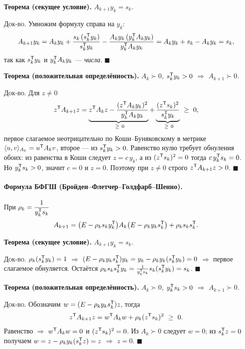 \textbf{Теорема (секущее условие).} \textit{$A_{k+1}y_k = s_k$.}

\textsc{Док-во.} Умножим формулу справа на $y_k$:
\[
  A_{k+1}y_k = A_k y_k
    + \frac{s_k\,(s_k^{\mathsf{T}} y_k)}{s_k^{\mathsf{T}} y_k}
    - \frac{A_k y_k\,(y_k^{\mathsf{T}} A_k y_k)}{y_k^{\mathsf{T}} A_k y_k}
    = A_k y_k + s_k - A_k y_k = s_k ,
\]
так как $s_k^{\mathsf{T}} y_k$ и $y_k^{\mathsf{T}} A_k y_k$ — \emph{числа}. $\blacksquare$

\textbf{Теорема (положительная определённость).}
\textit{$A_k \succ 0$, $s_k^{\mathsf{T}} y_k > 0$ $\Rightarrow$ $A_{k+1} \succ 0$.}

\textsc{Док-во.} Для $z \ne 0$
\[
  z^{\mathsf{T}} A_{k+1} z = \underbrace{z^{\mathsf{T}} A_k z
    - \frac{(z^{\mathsf{T}} A_k y_k)^2}{y_k^{\mathsf{T}} A_k y_k}}_{\ \ge\ 0}
    + \underbrace{\frac{(z^{\mathsf{T}} s_k)^2}{s_k^{\mathsf{T}} y_k}}_{\ \ge\ 0} \ \ge\ 0 ,
\]
первое слагаемое неотрицательно по Коши--Буняковскому в метрике
$\langle u,v\rangle_{A_k} = u^{\mathsf{T}} A_k v$, второе — из $s_k^{\mathsf{T}} y_k > 0$.
Равенство нулю требует обнуления обоих: из равенства в Коши следует
$z = c\,y_k$, а из $(z^{\mathsf{T}} s_k)^2 = 0$ тогда $c\,y_k^{\mathsf{T}} s_k = 0$. Но
$y_k^{\mathsf{T}} s_k > 0$, значит $c = 0$ и $z = 0$. Поэтому при $z \ne 0$ строго
$z^{\mathsf{T}} A_{k+1}z > 0$. $\blacksquare$

\paragraph{Формула БФГШ (Бройден--Флетчер--Голдфарб--Шенно).}
При $\rho_k = \dfrac{1}{y_k^{\mathsf{T}} s_k}$
\[
  A_{k+1} = \big(E - \rho_k s_k y_k^{\mathsf{T}}\big) A_k
            \big(E - \rho_k y_k s_k^{\mathsf{T}}\big) + \rho_k s_k s_k^{\mathsf{T}} .
\]

\textbf{Теорема (секущее условие).} \textit{$A_{k+1}y_k = s_k$.}

\textsc{Док-во.} $\rho_k(s_k^{\mathsf{T}} y_k) = 1$ $\Rightarrow$
$(E - \rho_k y_k s_k^{\mathsf{T}})y_k = y_k - \rho_k y_k (s_k^{\mathsf{T}} y_k) = 0$ $\Rightarrow$
первое слагаемое обнуляется. Остаётся
$\rho_k s_k s_k^{\mathsf{T}} y_k = \frac{1}{y_k^{\mathsf{T}} s_k}s_k (s_k^{\mathsf{T}} y_k) = s_k$.
$\blacksquare$

\textbf{Теорема (положительная определённость).}
\textit{$A_k \succ 0$, $y_k^{\mathsf{T}} s_k > 0$ $\Rightarrow$ $A_{k+1} \succ 0$.}

\textsc{Док-во.} Обозначим $w = (E - \rho_k y_k s_k^{\mathsf{T}})z$, тогда
\[
  z\T A_{k+1} z = w\T A_k w + \rho_k (z\T s_k)^2 \ \ge\ 0 .
\]
Равенство $\Rightarrow$ $w^{\mathsf{T}} A_k w = 0$ и $(z^{\mathsf{T}} s_k)^2 = 0$. Из
$A_k \succ 0$ следует $w = 0$; из $s_k^{\mathsf{T}} z = 0$ получаем
$w = z - \rho_k y_k(s_k^{\mathsf{T}} z) = z$ $\Rightarrow$ $z = 0$. $\blacksquare$

